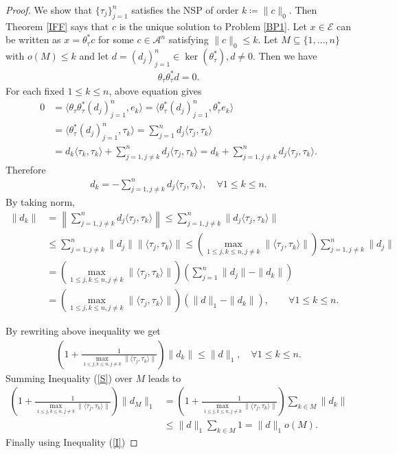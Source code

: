 \documentclass[10pt,a4paper]{amsart}
\begin{document}
\begin{proof}
We show that 	$\{\tau_j\}_{j=1}^n $  satisfies the  NSP of order $k\coloneqq \|c\|_0$. Then Theorem \ref{IFF} says that $c$ is the unique solution to Problem \ref{BP1}. Let  $x \in \mathcal{E}$ can be written as  $	x=\theta_\tau^* c$ for some  $c \in  \mathcal{A}^n$ satisfying $\|c\|_0\leq k$. Let $ M \subseteq   \{1, \dots, n\} $ with $o(M)\leq k$ and let $d=(d_j)_{j=1}^n \in \ker(\theta_\tau^*), d \neq 0$. Then we have 
\begin{align*}
	\theta_\tau\theta_\tau^* d=0.
\end{align*}
For each fixed $1\leq k \leq n$, above equation gives
\begin{align*}
	0&=\langle 	\theta_\tau\theta_\tau^*(d_j)_{j=1}^n, e_k \rangle=\langle 	\theta_\tau^*(d_j)_{j=1}^n, \theta_\tau^*e_k \rangle\\
	&=\langle 	\theta_\tau^*(d_j)_{j=1}^n, \tau_k \rangle
	=\sum_{j=1}^{n}d_j\langle \tau_j, \tau_k\rangle\\
	&=d_k\langle \tau_k, \tau_k\rangle+\sum_{j=1, j \neq k}^{n}d_j\langle \tau_j, \tau_k\rangle=d_k+\sum_{j=1, j \neq k}^{n}d_j\langle \tau_j, \tau_k\rangle.
\end{align*}
Therefore 
\begin{align*}
d_k=-\sum_{j=1, j\neq k}^nd_j\langle \tau_j, \tau_k\rangle, \quad \forall 1\leq k \leq n.	
\end{align*}
By taking norm,  
\begin{align*}
	\|d_k\|&=\left\|\sum_{j=1, j\neq k}^nd_j\langle \tau_j, \tau_k\rangle\right\|\leq \sum_{j=1, j\neq k}^n\|d_j\langle \tau_j, \tau_k\rangle\|\\
	&\leq \sum_{j=1, j\neq k}^n\|d_j\|\|\langle \tau_j, \tau_k\rangle\|
	\leq \left(\displaystyle\max_{1\leq j, k \leq n, j\neq k}\|\langle \tau_j, \tau_k\rangle\|\right)\sum_{j=1, j\neq k}^n\|d_j\|\\
	&=\left(\displaystyle\max_{1\leq j, k \leq n, j\neq k}\|\langle \tau_j, \tau_k\rangle\|\right)\left(\sum_{j=1}^n\|d_j\|-\|d_k\|\right)\\
	&=\left(\displaystyle\max_{1\leq j, k \leq n, j\neq k}\|\langle \tau_j, \tau_k\rangle\|\right)\left(\|d\|_1-\|d_k\|\right), \quad \quad \forall 1\leq k \leq n.
\end{align*}

By rewriting above inequality  we get
\begin{align}\label{S}
	\left(1+\frac{1}{\displaystyle\max_{1\leq j, k \leq n, j\neq k}\|\langle \tau_j, \tau_k\rangle\|}\right)\|d_k\|\leq \|d\|_1, \quad  \forall 1\leq k \leq n.
\end{align}
Summing Inequality (\ref{S}) over $M$ leads to 
\begin{align*}
		\left(1+\frac{1}{\displaystyle\max_{1\leq j, k \leq n, j\neq k}\|\langle \tau_j, \tau_k\rangle\|}\right)\|d_M\|_1&=	\left(1+\frac{1}{\displaystyle\max_{1\leq j, k \leq n, j\neq k}\|\langle \tau_j, \tau_k\rangle\|}\right)\sum_{k\in M}\|d_k\|\\
	&\leq \|d\|_1	\sum_{k \in M} 1= \|d\|_1o(M).
\end{align*}
Finally using Inequality (\ref{I})


\end{proof}
\end{document}
